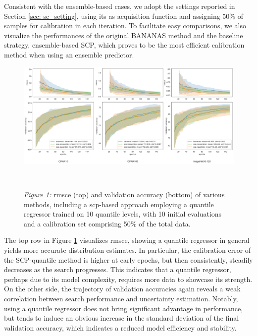 \documentclass[a4paper,oneside,bibliography=totoc]{scrbook}
\begin{document}
\begin{description}[leftmargin=0cm, listparindent=\parindent]
 	\item[Performance for SCP:] Consistent with the ensemble-based cases, we adopt the settings reported in Section \ref{sec: sc_setting}, using \gls{its} as acquisition function and assigning 50\% of samples for calibration in each iteration. To facilitate easy comparisons, we also visualize the performances of the original BANANAS method and the baseline strategy, ensemble-based SCP, which proves to be the most efficient calibration method when using an ensemble predictor.
 	
 	\vspace{0.7em}
	\begin{figure}[H]
		\centering
		\includegraphics[scale=0.37 ]{figs/scp_quantile.png}
		\label{fig: scp_quantile}
		\\
 		\parbox{\linewidth}{
 		\vspace{0.5em}
  		{\small \textit{Figure \ref{fig: scp_quantile}:} \gls{rmsce} (top) and validation accuracy (bottom) of various methods, including a \gls{scp}-based approach employing a quantile regressor trained on 10 quantile levels, with 10 initial evaluations and a calibration set comprising 50\% of the total data.}
 	 	}	
	\end{figure}	
 	\vspace{0.2em}

 	The top row in Figure \ref{fig: scp_quantile} visualizes \gls{rmsce}, showing a quantile regressor in general yields more accurate distribution estimates. In particular, the calibration error of the SCP-quantile method is higher at early epochs, but then consistently, steadily decreases as the search progresses. This indicates that a quantile regressor, perhaps due to its model complexity, requires more data to showcase its strength. On the other side, the trajectory of validation accuracies again reveals a weak correlation between search performance and uncertainty estimation. Notably, using a quantile regressor does not bring significant advantage in performance, but tends to induce an obvious increase in the standard deviation of the final validation accuracy, which indicates a reduced model efficiency and stability. 
 	 	 	

\end{description}
\end{document}
